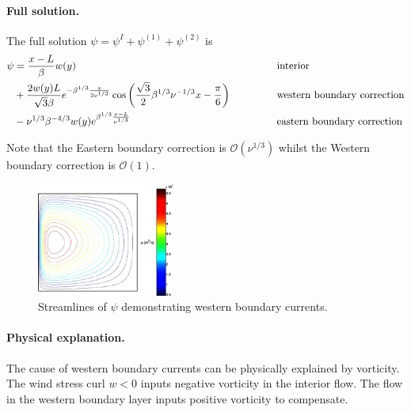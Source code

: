 \documentclass{jknotes}
\begin{document}
\paragraph{Full solution.} The full solution $\psi = \psi^I + \psi^{(1)} +
\psi^{(2)}$ is
\begin{align}
	\psi &= \frac{x-L}{\beta} w(y)  &&\text{interior}\\
			   &+ \frac{2w(y)L}{\sqrt{3}\beta} e^{-\beta^{1/3}
	\frac{x}{2\nu^{1/3}}} \cos\left(\frac{\sqrt{3}}{2}\beta^{1/3}\nu^{-1/3}x -
\frac{\pi}{6}\right) \hspace{.5in} &&\text{western boundary correction}\\
&- \nu^{1/3}\beta^{-4/3}w(y)e^{\beta^{1/3}\frac{x-L}{\nu^{1/3}}} 
&&\text{eastern boundary correction} \label{eq:wbc}
\end{align}

Note that the Eastern boundary correction is $\mathcal{O}(\nu^{1/3})$ whilst
the Western boundary correction is $\mathcal{O}(1)$.
\begin{figure}
	\centering
	\includegraphics[width=0.4\textwidth]{wbc.png}
	\caption{Streamlines of $\psi$ demonstrating
	western boundary currents.}
\end{figure}

\paragraph{Physical explanation.} The cause of western boundary currents can
be physically explained by vorticity.  The wind stress curl $w < 0$ inputs
negative vorticity in the interior flow. The flow in the western boundary
layer inputs positive vorticity to compensate.

\begin{center}
\end{center}
\end{document}
